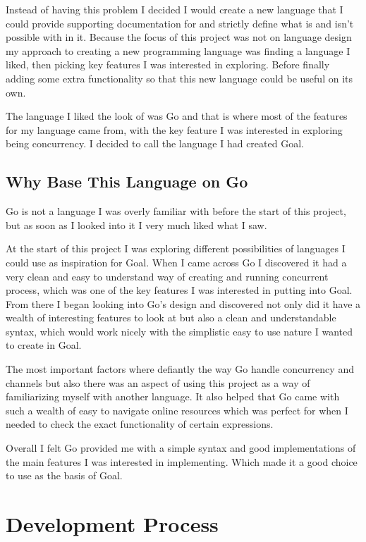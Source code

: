 Instead of having this problem I decided I would create a new language that I could provide supporting documentation for and strictly define what is and isn't possible with in it. Because the focus of this project was not on language design my approach to creating a new programming language was finding a language I liked, then picking key features I was interested in exploring. Before finally adding some extra functionality so that this new language could be useful on its own.

The language I liked the look of was Go and that is where most of the features for my language came from, with the key feature I was interested in exploring being concurrency. I decided to call the language I had created Goal.

\subsection{Why Base This Language on Go} 

Go is not a language I was overly familiar with before the start of this project, but as soon as I looked into it I very much liked what I saw. 

At the start of this project I was exploring different possibilities of languages I could use as inspiration for Goal. When I came across Go I discovered it had a very clean and easy to understand way of creating and running concurrent process, which was one of the key features I was interested in putting into Goal. From there I began looking into Go's design and discovered not only did it have a wealth of interesting features to look at but also a clean and understandable syntax, which would work nicely with the simplistic easy to use nature I wanted to create in Goal.

The most important factors where defiantly the way Go handle concurrency and channels but also there was an aspect of using this project as a way of familiarizing myself with another language. It also helped that Go came with such a wealth of easy to navigate online resources which was perfect for when I needed to check the exact functionality of certain expressions.

Overall I felt Go provided me with a simple syntax and good implementations of the main features I was interested in implementing. Which made it a good choice to use as the basis of Goal.

\section{Development Process }

